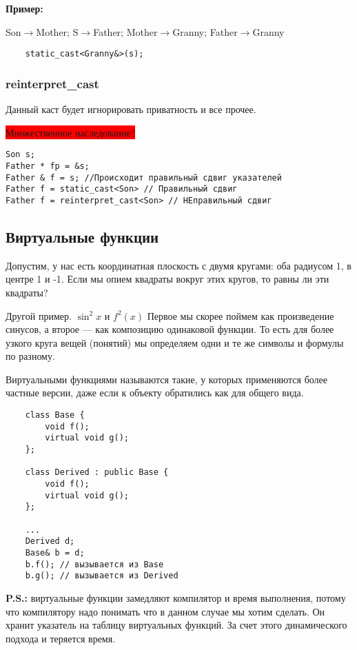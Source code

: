 \documentclass[12pt]{article}
\newcommand{\ps}{\textbf{P.S.: }}
\begin{document}
\textbf{Пример:}

\begin{center}
	Son$\rightarrow$Mother; S$\rightarrow$Father; Mother$\rightarrow$Granny; Father$\rightarrow$Granny
\end{center}

\begin{lstlisting}
	static_cast<Granny&>(s);
\end{lstlisting}

\subsubsection{reinterpret\_cast}

Данный каст будет игнорировать приватность и все прочее. 

\colorbox{red}{Множественное наследование?}
\begin{lstlisting}
Son s;
Father * fp = &s;
Father & f = s; //Происходит правильный сдвиг указателей
Father f = static_cast<Son> // Правильный сдвиг
Father f = reinterpret_cast<Son> // НЕправильный сдвиг
\end{lstlisting}

\subsection{Виртуальные функции}

Допустим, у нас есть координатная плоскость с двумя кругами: оба радиусом 1, в центре 1 и -1. Если мы опием квадраты вокруг этих кругов, то равны ли эти квадраты?

Другой пример. $\sin^2{x}$ и $f^2(x)$ Первое мы скорее поймем как произведение синусов, а второе --- как композицию одинаковой функции. То есть для более узкого круга вещей (понятий) мы определяем одни и те же символы и формулы по разному. 

Виртуальными функциями называются такие, у которых применяются более частные версии, даже если к объекту обратились как для общего вида. 

\begin{lstlisting}
	class Base {
		void f();
		virtual void g();	
	};
	
	class Derived : public Base {
		void f();
		virtual void g();
	};
	
	...
	Derived d;
	Base& b = d;
	b.f(); // вызывается из Base
	b.g(); // вызывается из Derived
\end{lstlisting}

\ps виртуальные функции замедляют компилятор и время выполнения, потому что компилятору надо понимать что в данном случае мы хотим сделать. Он хранит указатель на таблицу виртуальных функций. За счет этого динамического подхода и теряется время. 
\end{document}
